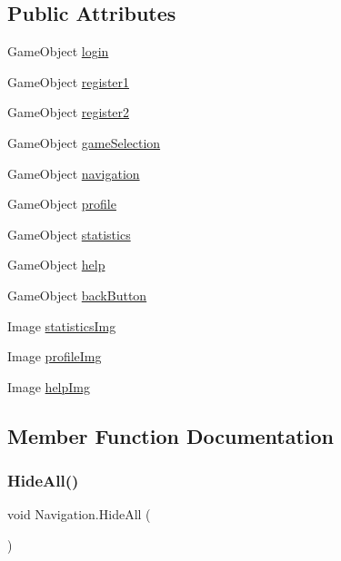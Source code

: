 \subsection*{Public Attributes}
\begin{DoxyCompactItemize}
\item 
Game\+Object \hyperlink{classNavigation_a53350aa2fd4e6ce8d70e1dc54584e92c}{login}
\item 
Game\+Object \hyperlink{classNavigation_a53aaee614afe3cb99f5afb97f2a67523}{register1}
\item 
Game\+Object \hyperlink{classNavigation_ad2ad65dbfa040e32311c701a5d6439d3}{register2}
\item 
Game\+Object \hyperlink{classNavigation_af5e4b44d4f2255917f95b7445219fc8d}{game\+Selection}
\item 
Game\+Object \hyperlink{classNavigation_aa865d3cc0bd8b275192401b7e9acc32c}{navigation}
\item 
Game\+Object \hyperlink{classNavigation_a8f74e4a7ca9388161978a05e99030d1f}{profile}
\item 
Game\+Object \hyperlink{classNavigation_a5a9426b858638327978c978a100daed9}{statistics}
\item 
Game\+Object \hyperlink{classNavigation_a19e6fd33ddbc36a19b246c83ade68de3}{help}
\item 
Game\+Object \hyperlink{classNavigation_a0ee38b7f1ef62389b7e86d4a2b0b3b50}{back\+Button}
\item 
Image \hyperlink{classNavigation_a9595a025ba9a2c6146c59e8fc7b46bde}{statistics\+Img}
\item 
Image \hyperlink{classNavigation_a236fdfb88c454fdd052ccf098cda88c3}{profile\+Img}
\item 
Image \hyperlink{classNavigation_a521403413237b02ab8be9476b68c8cb1}{help\+Img}
\end{DoxyCompactItemize}


\subsection{Member Function Documentation}
\mbox{\label{classNavigation_a4470d35dbb7dc8062db61961e4b9b66a}} 
\subsubsection{\texorpdfstring{Hide\+All()}{HideAll()}}
{\footnotesize\ttfamily void Navigation.\+Hide\+All (\begin{DoxyParamCaption}{ }\end{DoxyParamCaption})\hspace{0.3cm}{\ttfamily [inline]}}


